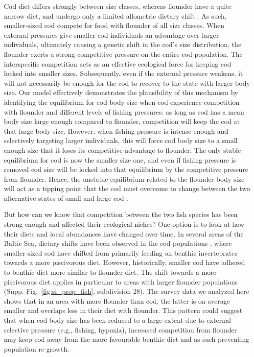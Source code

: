 \documentclass[9pt,twocolumn,twoside]{pnas-new}
\begin{document}
Cod diet differs strongly between size classes, whereas flounder have a quite narrow diet, and undergo only a limited allometric dietary shift \citep{Haase2020}. As such, smaller-sized cod compete for food with flounder of all size classes. When external pressures give smaller cod individuals an advantage over larger individuals, ultimately causing a genetic shift in the cod's size distribution, the flounder exerts a strong competitive pressure on the entire cod population. The interspecific competition acts as an effective ecological force for keeping cod locked into smaller sizes. Subsequently, even if the external pressure weakens, it will not necessarily be enough for the cod to recover to the state with larger body size. Our model effectively demonstrates the plausibility of this mechanism by identifying the equilibrium for cod body size when cod experience competition with flounder and different levels of fishing pressures: as long as cod has a mean body size large enough compared to flounder, competition will keep the cod at that large body size. However, when fishing pressure is intense enough and selectively targeting larger individuals, this will force cod body size to a small enough size that it loses its competitive advantage to flounder. The only stable equilibrium for cod is now the smaller size one, and even if fishing pressure is removed cod size will be locked into that equilibrium by the competitive pressure from flounder. Hence, the unstable equilibrium related to the flounder body size will act as a tipping point that the cod must overcome to change between the two alternative states of small and large cod \citep{Dakos2022}.

But how can we know that competition between the two fish species has been strong enough and affected their ecological niches? One option is to look at how their diets and local abundances have changed over time. In several areas of the Baltic Sea, dietary shifts have been observed in the cod populations \citep[e.g.][]{Kulatska2019, Haase2020, Neuenfeldt2020}, where smaller-sized cod have shifted from primarily feeding on benthic invertebrates towards a more piscivorous diet. However, historically, smaller cod have adhered to benthic diet more similar to flounder diet. The shift towards a more piscivorous diet applies in particular to areas with larger flounder populations (Supp. Fig.~\ref{fig:si_prop_fish}, subdivision 28). The survey data we analyzed here shows that in an area with more flounder than cod, the latter is on average smaller and overlaps less in their diet with flounder. This pattern could suggest that when cod body size has been reduced to a large extent due to external selective pressure (e.g., fishing, hypoxia), increased competition from flounder may keep cod away from the more favourable benthic diet \citep{ICES2015} and as such preventing population re-growth. 
\end{document}
